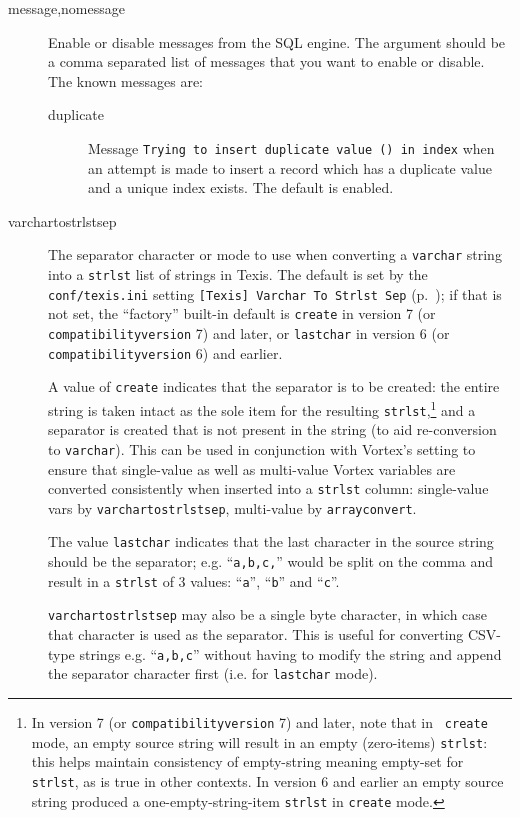 \begin{description}
\item[message,nomessage] Enable or disable messages from the SQL engine.
The argument should be a comma separated list of messages that you want to
enable or disable.  The known messages are:
\begin{description}
\item[duplicate]  Message {\tt Trying to insert duplicate value () in index}
when an attempt is made to insert a record which has a duplicate value and
a unique index exists.  The default is enabled.
\end{description}

\item[varchartostrlstsep]
\label{`varchartostrlstsep'}
  The separator character or mode to use when converting a
  \verb`varchar` string into a \verb`strlst` list of strings in Texis.
  The default is set by the \verb`conf/texis.ini` setting {\tt [Texis]
    Varchar To Strlst Sep} (p.~\pageref{tcVarcharToStrlstSep}); if
  that is not set, the ``factory'' built-in default is \verb`create`
  in version 7 (or \verb`compatibilityversion` 7) and later, or
  \verb`lastchar` in version 6 (or \verb`compatibilityversion` 6) and
  earlier.

  A value of \verb`create` indicates that the separator is to be
  created: the entire string is taken intact as the sole item for the
  resulting \verb`strlst`,\footnote{In version 7 (or
    \verb`compatibilityversion` 7) and later, note that in {\tt
      create} mode, an empty source string will result in an empty
    (zero-items) {\tt strlst}: this helps maintain consistency of
    empty-string meaning empty-set for {\tt strlst}, as is true in
    other contexts.  In version 6 and earlier an empty source string
    produced a one-empty-string-item {\tt strlst} in {\tt create}
    mode.} and a separator is created that is not present in the
  string (to aid re-conversion to \verb`varchar`).  This can be used
  in conjunction with Vortex's {\tt <sqlcp arrayconvert>} setting to
  ensure that single-value as well as multi-value Vortex variables are
  converted consistently when inserted into a \verb`strlst` column:
  single-value vars by \verb`varchartostrlstsep`, multi-value by
  \verb`arrayconvert`.

  The value \verb`lastchar` indicates that the last character in the
  source string should be the separator; e.g. ``{\tt a,b,c,}'' would
  be split on the comma and result in a \verb`strlst` of 3 values:
  ``{\tt a}'', ``{\tt b}'' and ``{\tt c}''.

  \verb`varchartostrlstsep` may also be a single byte character, in
  which case that character is used as the separator.  This is useful
  for converting CSV-type strings e.g. ``{\tt a,b,c}'' without having to
  modify the string and append the separator character first (i.e. for
  {\tt lastchar} mode).


\end{description}
